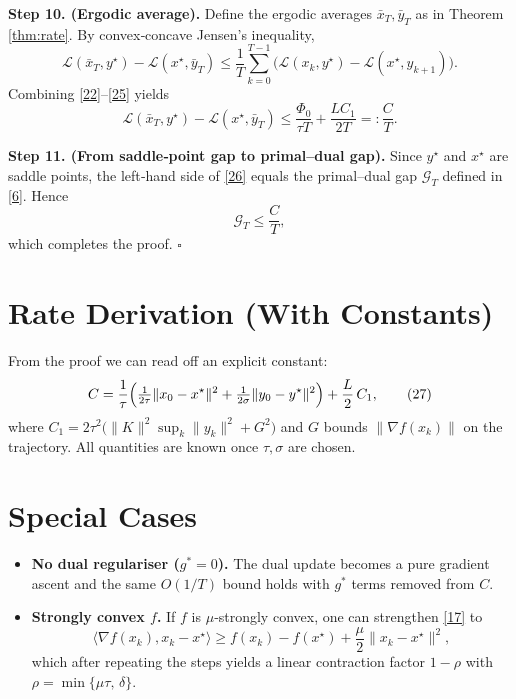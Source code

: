 \documentclass{article}
\begin{document}
\noindent\textbf{Step 10. (Ergodic average).}  
Define the ergodic averages $\bar{x}_{T},\bar{y}_{T}$ as in Theorem \ref{thm:rate}. By convex‑concave Jensen’s inequality,
\[
\mathcal{L}(\bar{x}_{T},y^{\star})-\mathcal{L}(x^{\star},\bar{y}_{T})
\le \frac{1}{T}\sum_{k=0}^{T-1}\bigl(\mathcal{L}(x_{k},y^{\star})-\mathcal{L}(x^{\star},y_{k+1})\bigr).
\tag{25}
\]
Combining \eqref{22}–\eqref{25} yields
\[
\mathcal{L}(\bar{x}_{T},y^{\star})-\mathcal{L}(x^{\star},\bar{y}_{T})
\le
\frac{\Phi_{0}}{\tau T}
+\frac{LC_{1}}{2T}
=: \frac{C}{T}.
\tag{26}
\]

\noindent\textbf{Step 11. (From saddle‑point gap to primal–dual gap).}  
Since $y^{\star}$ and $x^{\star}$ are saddle points, the left‑hand side of \eqref{26} equals the primal–dual gap $\mathcal{G}_{T}$ defined in \eqref{6}. Hence
\[
\mathcal{G}_{T}\le \frac{C}{T},
\]
which completes the proof. \hfill $\square$

\section*{Rate Derivation (With Constants)}
From the proof we can read off an explicit constant:
\[
C
=
\frac{1}{\tau}\Bigl(\tfrac{1}{2\tau}\|x_{0}-x^{\star}\|^{2}
+\tfrac{1}{2\sigma}\|y_{0}-y^{\star}\|^{2}\Bigr)
+\frac{L}{2}\,C_{1},
\tag{27}
\]
where $C_{1}=2\tau^{2}\bigl(\|K\|^{2}\sup_{k}\|y_{k}\|^{2}+G^{2}\bigr)$ and $G$ bounds $\|\nabla f(x_{k})\|$ on the trajectory. All quantities are known once $\tau,\sigma$ are chosen.

\section*{Special Cases}
\begin{itemize}
\item \textbf{No dual regulariser ($g^{*}=0$).} The dual update becomes a pure gradient ascent and the same $O(1/T)$ bound holds with $g^{*}$ terms removed from $C$.
\item \textbf{Strongly convex $f$.} If $f$ is $\mu$‑strongly convex, one can strengthen \eqref{17} to
\[
\langle \nabla f(x_{k}),x_{k}-x^{\star}\rangle\ge f(x_{k})-f(x^{\star})+\frac{\mu}{2}\|x_{k}-x^{\star}\|^{2},
\]
which after repeating the steps yields a linear contraction factor $1-\rho$ with $\rho=\min\{\mu\tau,\,\delta\}$.
\end{itemize}
\end{document}
